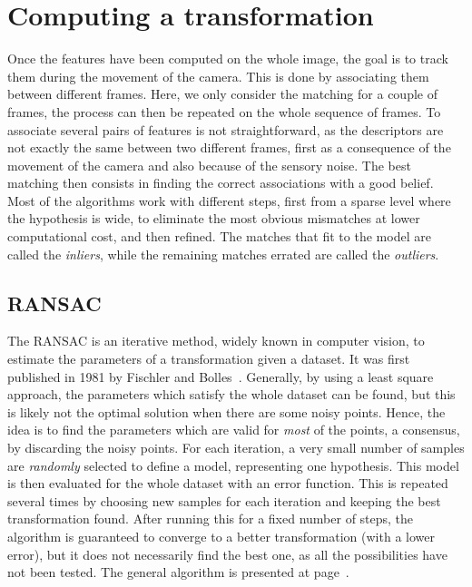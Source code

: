 \section{Computing a transformation}

Once the features have been computed on the whole image, the goal is to track them during the movement of the camera. This is done by associating them between different frames. Here, we only consider the matching for a couple of frames, the process can then be repeated on the whole sequence of frames. To associate several pairs of features is not straightforward, as the descriptors are not exactly the same between two different frames, first as a consequence of the movement of the camera and also because of the sensory noise. The best matching then consists in finding the correct associations with a good belief. Most of the algorithms work with different steps, first from a sparse level where the hypothesis is wide, to eliminate the most obvious mismatches at lower computational cost, and then refined. The matches that fit to the model are called the \emph{inliers}, while the remaining matches errated are called the \emph{outliers}.

\subsection{RANSAC}
\label{sub:ransac}

The \gls{RANSAC} is an iterative method, widely known in computer vision, to estimate the parameters of a transformation given a dataset. It was first published in 1981 by Fischler and Bolles~\cite{FischlerB81}. Generally, by using a least square approach, the parameters which satisfy the whole dataset can be found, but this is likely not the optimal solution when there are some noisy points. Hence, the idea is to find the parameters which are valid for \emph{most} of the points, a consensus, by discarding the noisy points. For each iteration, a very small number of samples are \emph{randomly} selected to define a model, representing one hypothesis. This model is then evaluated for the whole dataset with an error function. This is repeated several times by choosing new samples for each iteration and keeping the best transformation found. After running this for a fixed number of steps, the algorithm is guaranteed to converge to a better transformation (with a lower error), but it does not necessarily find the best one, as all the possibilities have not been tested. The general algorithm is presented at page~\pageref{alg:generic_ransac}.

